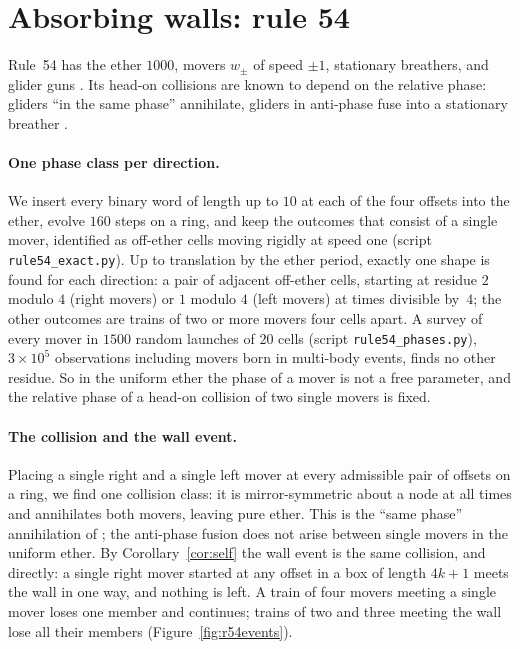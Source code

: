 \documentclass[11pt,a4paper]{article}
\theoremstyle{definition}
\theoremstyle{remark}
\begin{document}
\section{Absorbing walls: rule 54}\label{sec:r54}

Rule~54 has the ether $1000$, movers $w_\pm$ of speed $\pm1$, stationary
breathers, and glider guns \cite{Boccara,HansonCrutchfield,Martinez2006,Martinez2014}.
Its head-on collisions are known to depend on the relative phase:
gliders ``in the same phase'' annihilate, gliders in anti-phase fuse into
a stationary breather \cite{Martinez2006}.

\paragraph{One phase class per direction.} We insert every binary word
of length up to $10$ at each of the four offsets into the ether, evolve
$160$ steps on a ring, and keep the outcomes that consist of a single
mover, identified as off-ether cells moving rigidly at speed one
(script \texttt{rule54\_exact.py}). Up to translation by the ether
period, exactly one shape is found for each direction: a pair of
adjacent off-ether cells, starting at residue $2$ modulo $4$ (right
movers) or $1$ modulo $4$ (left movers) at times divisible by~$4$; the
other outcomes are trains of two or more movers four cells apart. A
survey of every mover in $1500$ random launches of $20$ cells
(script \texttt{rule54\_phases.py}), $3\times10^5$ observations including
movers born in multi-body events, finds no other residue. So in the
uniform ether the phase of a mover is not a free parameter, and the
relative phase of a head-on collision of two single movers is fixed.

\paragraph{The collision and the wall event.} Placing a single right
and a single left mover at every admissible pair of offsets on a ring,
we find one collision class: it is mirror-symmetric about a node at all
times and annihilates both movers, leaving pure ether. This is the
``same phase'' annihilation of \cite{Martinez2006}; the anti-phase
fusion does not arise between single movers in the uniform ether. By
Corollary~\ref{cor:self} the wall event is the same collision, and
directly: a single right mover started at any offset in a box of length
$4k+1$ meets the wall in one way, and nothing is left. A train of four
movers meeting a single mover loses one member and continues; trains of
two and three meeting the wall lose all their members
(Figure~\ref{fig:r54events}).
\end{document}
